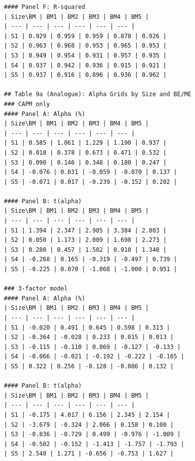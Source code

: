 \begin{verbatim}
#### Panel F: R-squared
| Size\BM | BM1 | BM2 | BM3 | BM4 | BM5 |
| --- | --- | --- | --- | --- | --- |
| S1 | 0.929 | 0.959 | 0.959 | 0.878 | 0.926 |
| S2 | 0.963 | 0.968 | 0.953 | 0.965 | 0.953 |
| S3 | 0.949 | 0.954 | 0.931 | 0.957 | 0.935 |
| S4 | 0.937 | 0.942 | 0.936 | 0.915 | 0.921 |
| S5 | 0.937 | 0.916 | 0.896 | 0.936 | 0.962 |

## Table 9a (Analogue): Alpha Grids by Size and BE/ME
### CAPM only
#### Panel A: Alpha (%)
| Size\BM | BM1 | BM2 | BM3 | BM4 | BM5 |
| --- | --- | --- | --- | --- | --- |
| S1 | 0.585 | 1.061 | 1.229 | 1.190 | 0.937 |
| S2 | 0.018 | 0.378 | 0.673 | 0.471 | 0.532 |
| S3 | 0.090 | 0.146 | 0.348 | 0.180 | 0.247 |
| S4 | -0.076 | 0.031 | -0.059 | -0.070 | 0.137 |
| S5 | -0.071 | 0.017 | -0.239 | -0.152 | 0.202 |

#### Panel B: t(alpha)
| Size\BM | BM1 | BM2 | BM3 | BM4 | BM5 |
| --- | --- | --- | --- | --- | --- |
| S1 | 1.394 | 2.347 | 2.905 | 3.384 | 2.803 |
| S2 | 0.050 | 1.173 | 2.009 | 1.698 | 2.273 |
| S3 | 0.280 | 0.457 | 1.502 | 0.910 | 1.340 |
| S4 | -0.268 | 0.165 | -0.319 | -0.497 | 0.739 |
| S5 | -0.225 | 0.070 | -1.068 | -1.000 | 0.951 |

### 3-factor model
#### Panel A: Alpha (%)
| Size\BM | BM1 | BM2 | BM3 | BM4 | BM5 |
| --- | --- | --- | --- | --- | --- |
| S1 | -0.020 | 0.491 | 0.645 | 0.598 | 0.313 |
| S2 | -0.364 | -0.028 | 0.233 | 0.015 | 0.013 |
| S3 | -0.115 | -0.110 | 0.069 | -0.127 | -0.133 |
| S4 | -0.066 | -0.021 | -0.192 | -0.222 | -0.165 |
| S5 | 0.322 | 0.256 | -0.128 | -0.086 | 0.132 |

#### Panel B: t(alpha)
| Size\BM | BM1 | BM2 | BM3 | BM4 | BM5 |
| --- | --- | --- | --- | --- | --- |
| S1 | -0.175 | 4.017 | 6.156 | 2.345 | 2.154 |
| S2 | -3.679 | -0.324 | 2.066 | 0.158 | 0.100 |
| S3 | -0.836 | -0.729 | 0.499 | -0.976 | -1.009 |
| S4 | -0.502 | -0.152 | -1.413 | -1.757 | -1.793 |
| S5 | 2.540 | 1.271 | -0.656 | -0.753 | 1.627 |

\end{verbatim}